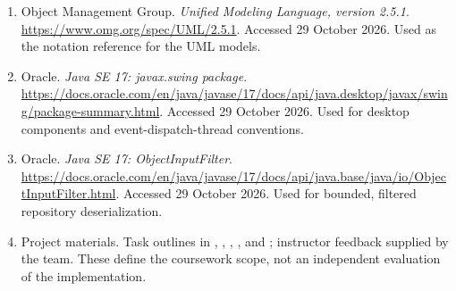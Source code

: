 \begingroup\raggedright\begin{enumerate}
\item Object Management Group. \emph{Unified Modeling Language, version 2.5.1}. \url{https://www.omg.org/spec/UML/2.5.1}. Accessed 29 October 2026. Used as the notation reference for the UML models.
\item Oracle. \emph{Java SE 17: javax.swing package}. \url{https://docs.oracle.com/en/java/javase/17/docs/api/java.desktop/javax/swing/package-summary.html}. Accessed 29 October 2026. Used for desktop components and event-dispatch-thread conventions.
\item Oracle. \emph{Java SE 17: ObjectInputFilter}. \url{https://docs.oracle.com/en/java/javase/17/docs/api/java.base/java/io/ObjectInputFilter.html}. Accessed 29 October 2026. Used for bounded, filtered repository deserialization.
\item Project materials. Task outlines in , , , , and ; instructor feedback supplied by the team. These define the coursework scope, not an independent evaluation of the implementation.
\end{enumerate}\endgroup
